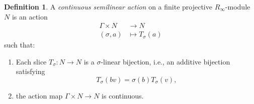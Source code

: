 \documentclass[10pt,twoside]{article}
\numberwithin{equation}{section}
\theoremstyle{plain}
\theoremstyle{definition}
\newtheorem{mydef}[mythm]{Definition}
\begin{document}
\begin{mydef}\label{proposalSemilinearAction}
A \emph{continuous semilinear action} on a finite projective \(R_\infty\)-module \(N\) is an action 
\begin{align*}
\Gamma\times N&\longrightarrow N\\
(\sigma, a)&\mapsto T_\sigma(a)
\end{align*} 
such that:
\begin{enumerate}
\item Each slice \(T_\sigma\colon N\to N\) is a \(\sigma\)-linear bijection, i.e., an additive bijection satisfying
\[
T_\sigma(bv)=\sigma(b)T_\sigma(v),
\]
\item the action map \(\Gamma\times N\to N\) is continuous.
\end{enumerate}
\end{mydef}
\end{document}
